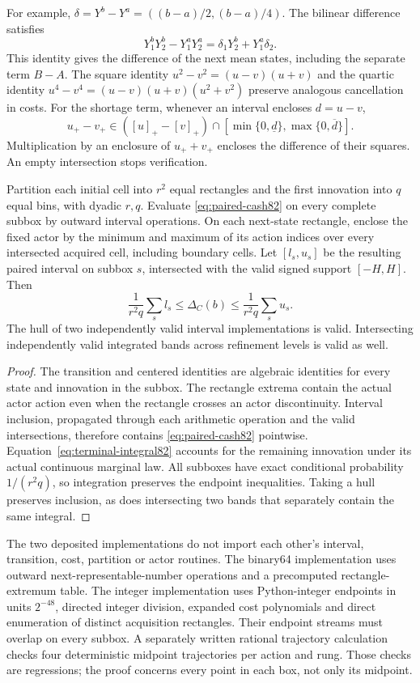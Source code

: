 For example, $\delta=Y^b-Y^a=((b-a)/2,(b-a)/4)$. The bilinear difference satisfies
\[
 Y^b_1Y^b_2-Y^a_1Y^a_2=\delta_1Y^b_2+Y^a_1\delta_2.
\]
This identity gives the difference of the next mean states, including the separate term $B-A$. The square identity $u^2-v^2=(u-v)(u+v)$ and the quartic identity $u^4-v^4=(u-v)(u+v)(u^2+v^2)$ preserve analogous cancellation in costs. For the shortage term, whenever an interval encloses $d=u-v$,
\[
 u_+-v_+\in([u]_+-[v]_+)\cap
       [\min\{0,\underline d\},\max\{0,\overline d\}].
\]
Multiplication by an enclosure of $u_++v_+$ encloses the difference of their squares. An empty intersection stops verification.

\begin{proposition}\label{prop:bins82}
Partition each initial cell into $r^2$ equal rectangles and the first innovation into $q$ equal bins, with dyadic $r,q$. Evaluate \eqref{eq:paired-cash82} on every complete subbox by outward interval operations. On each next-state rectangle, enclose the fixed actor by the minimum and maximum of its action indices over every intersected acquired cell, including boundary cells. Let $[l_s,u_s]$ be the resulting paired interval on subbox $s$, intersected with the valid signed support $[-H,H]$. Then
\[
 \frac1{r^2q}\sum_s l_s\le\Delta_C(b)
             \le\frac1{r^2q}\sum_s u_s.
\]
The hull of two independently valid interval implementations is valid. Intersecting independently valid integrated bands across refinement levels is valid as well.
\end{proposition}

\begin{proof}
The transition and centered identities are algebraic identities for every state and innovation in the subbox. The rectangle extrema contain the actual actor action even when the rectangle crosses an actor discontinuity. Interval inclusion, propagated through each arithmetic operation and the valid intersections, therefore contains \eqref{eq:paired-cash82} pointwise. Equation~\eqref{eq:terminal-integral82} accounts for the remaining innovation under its actual continuous marginal law. All subboxes have exact conditional probability $1/(r^2q)$, so integration preserves the endpoint inequalities. Taking a hull preserves inclusion, as does intersecting two bands that separately contain the same integral.
\end{proof}

The two deposited implementations do not import each other's interval, transition, cost, partition or actor routines. The binary64 implementation uses outward next-representable-number operations and a precomputed rectangle-extremum table. The integer implementation uses Python-integer endpoints in units $2^{-48}$, directed integer division, expanded cost polynomials and direct enumeration of distinct acquisition rectangles. Their endpoint streams must overlap on every subbox. A separately written rational trajectory calculation checks four deterministic midpoint trajectories per action and rung. Those checks are regressions; the proof concerns every point in each box, not only its midpoint.

